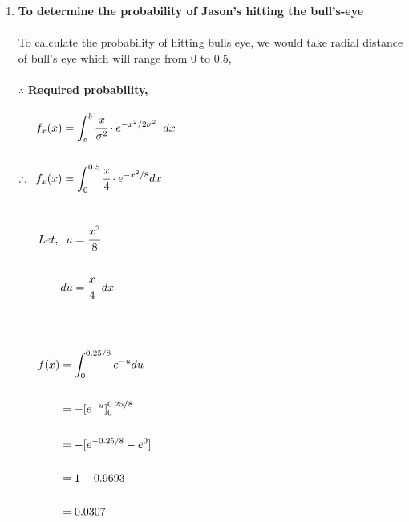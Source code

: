 \documentclass{article}
\begin{document}
\begin{enumerate}
\begin{enumerate}
\newpage
\item
\large
\textbf{To determine the probability of Jason’s hitting the bull’s-eye}\\\\
To calculate the probability of hitting bulls eye, we would take radial distance of bull's eye which will range from 0 to 0.5,\\\\
$\therefore$ \hspace{2mm} \textbf{Required probability,}\\\\
$\begin{aligned}
f_x(x) &= \int_a^b \cfrac{x}{\sigma ^2} \cdot e^{-x^2/2\sigma ^2} \hspace{2mm}dx\\\\
\therefore \hspace{2mm} f_x(x) &= \int_0^{0.5} \cfrac{x}{4} \cdot e^{-x^2/8} dx
\end{aligned}$\\\\\\
$\begin{aligned}
\hspace{6mm}Let, \hspace{2mm} u &= \cfrac{x^2}{8}\\\\
 du &= \cfrac{x}{4} \hspace{2mm} dx\\\\
\end{aligned}$\\\\\\
$\begin{aligned}
\hspace{6mm} f(x) &= \int_0^{0.25/8} e^{-u} du\\\\
&= - [ e^{-u}]_0^{0.25/8}\\\\
&= - [ e^{-0.25/8} - e^0 ]\\\\
&= 1 - 0.9693\\\\
&= 0.0307
\end{aligned}$


\end{enumerate}
\end{enumerate}
\end{document}
